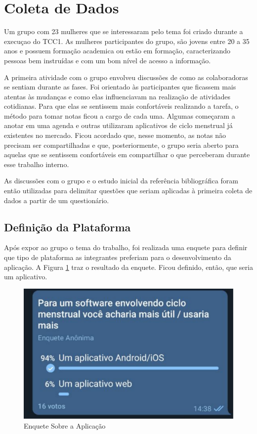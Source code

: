 \section{Coleta de Dados}

Um grupo com 23 mulheres que se interessaram pelo tema foi criado durante a execuçao do TCC1. 
As mulheres participantes do grupo, são jovens entre 20 a 35 anos e possuem 
formação academica ou estão em formação, caracterizando pessoas bem instruídas e com um bom 
nível de acesso a informação.

A primeira atividade com o grupo envolveu discussões de como as colaboradoras se sentiam durante as fases. Foi orientado
às participantes que ficassem mais atentas às mudanças e como elas influenciavam na realização de 
atividades cotidianas. Para que elas se sentissem mais confortáveis realizando a tarefa, o método para tomar notas ficou a cargo de cada uma. 
Algumas começaram a anotar em uma agenda e outras utilizaram 
aplicativos de ciclo menstrual já existentes no mercado. Ficou acordado que, 
nesse momento, as notas não precisam ser compartilhadas e que, posteriormente, o grupo seria aberto para 
aquelas que se sentissem confortáveis em compartilhar o que perceberam 
durante esse trabalho interno.

As discussões com o grupo e o estudo inicial da referência bibliográfica foram então utilizadas para 
delimitar questões que seriam aplicadas à primeira coleta de dados a partir de um questionário.

\subsection{Definição da Plataforma}

Após expor ao grupo o tema do trabalho, foi realizada uma enquete para definir que tipo de plataforma as 
integrantes preferiam para o desenvolvimento da aplicação. A Figura \ref{fig07} traz o resultado da enquete. 
Ficou definido, então, que seria um aplicativo.

\begin{figure}[ht]
    \centering
    \includegraphics[keepaspectratio=true,scale=0.3]{figuras/enqueteApp.pdf}
    \caption{Enquete Sobre a Aplicação}
        \label{fig07}
\end{figure}

